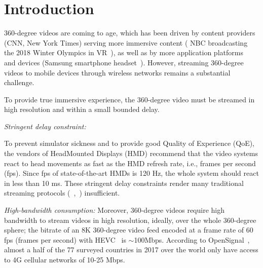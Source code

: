 \section{Introduction}

360-degree videos are coming to age, which has been driven by content
providers (\eg CNN, New York Times) serving more immersive content (\eg 
NBC broadcasting the 2018 Winter Olympics in VR~\cite{NBC_olympic_360}), as well as 
by more application platforms~\cite{google_developers,facebook360} and 
devices (\eg Samsung smartphone headset~\cite{SUMSUNG_HEADSET}).
However, streaming 360-degree videos to mobile devices through wireless
networks remains a substantial challenge.

To provide true immersive experience, the 360-degree video must be streamed
in high resolution and within a small bounded delay.

\begin{packeditemize}
\item {\em Stringent delay constraint:} 

To prevent simulator sickness \cite{Simulator_Sickness} and to provide good Quality of Experience (QoE), the vendors of HeadMounted Displays (HMD) recommend that the video systems
react to head movements as fast as the HMD refresh rate, i.e., frames per second (fps).
Since fps of state-of-the-art HMDs is 120 Hz,
the whole system should react in less than 10 ms. These stringent delay constraints render many traditional streaming 
protocols (\eg~\cite{MPEG-DASH},~\cite{FESTIVE}) insufficient.


\item {\em High-bandwidth consumption:}
Moreover, 360-degree videos require high bandwidth to stream videos in
high resolution, ideally, over the whole 360-degree sphere; \eg the 
bitrate of an 8K 360-degree video feed encoded at a frame rate of 60 fps
(frames per second) with HEVC~\cite{HEVC} is $\sim$100Mbps. According to
OpenSignal~\cite{opensignal}, almost a half of the 77 surveyed 
countries in 2017 over the world only have access to 4G cellular 
networks of 10-25 Mbps.
\end{packeditemize}

